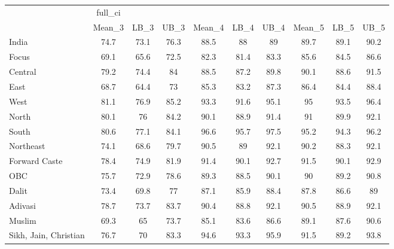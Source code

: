 \begin{tabular}{l*{9}{c}}
\toprule
                    &     full\_ci&            &            &            &            &            &            &            &            \\
                    &      Mean\_3&        LB\_3&        UB\_3&      Mean\_4&        LB\_4&        UB\_4&      Mean\_5&        LB\_5&        UB\_5\\
\midrule
India               &        74.7&        73.1&        76.3&        88.5&          88&          89&        89.7&        89.1&        90.2\\
Focus               &        69.1&        65.6&        72.5&        82.3&        81.4&        83.3&        85.6&        84.5&        86.6\\
Central             &        79.2&        74.4&          84&        88.5&        87.2&        89.8&        90.1&        88.6&        91.5\\
East                &        68.7&        64.4&          73&        85.3&        83.2&        87.3&        86.4&        84.4&        88.4\\
West                &        81.1&        76.9&        85.2&        93.3&        91.6&        95.1&          95&        93.5&        96.4\\
North               &        80.1&          76&        84.2&        90.1&        88.9&        91.4&          91&        89.9&        92.1\\
South               &        80.6&        77.1&        84.1&        96.6&        95.7&        97.5&        95.2&        94.3&        96.2\\
Northeast           &        74.1&        68.6&        79.7&        90.5&          89&        92.1&        90.2&        88.3&        92.1\\
Forward Caste       &        78.4&        74.9&        81.9&        91.4&        90.1&        92.7&        91.5&        90.1&        92.9\\
OBC                 &        75.7&        72.9&        78.6&        89.3&        88.5&        90.1&          90&        89.2&        90.8\\
Dalit               &        73.4&        69.8&          77&        87.1&        85.9&        88.4&        87.8&        86.6&          89\\
Adivasi             &        78.7&        73.7&        83.7&        90.4&        88.8&        92.1&        90.5&        88.9&        92.1\\
Muslim              &        69.3&          65&        73.7&        85.1&        83.6&        86.6&        89.1&        87.6&        90.6\\
Sikh, Jain, Christian&        76.7&          70&        83.3&        94.6&        93.3&        95.9&        91.5&        89.2&        93.8\\
\bottomrule
\end{tabular}

